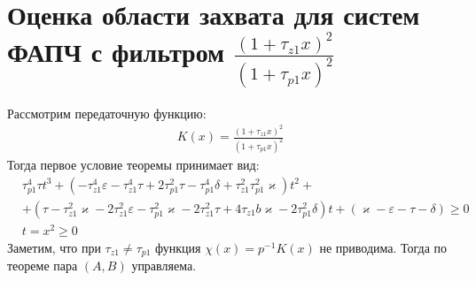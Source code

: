 \documentclass[a4paper,14pt]{extarticle} %
\begin{document}
\section{Оценка области захвата для систем ФАПЧ с фильтром $\frac{(1+\tau_{z1}x)^2}{(1+\tau_{p1}x)^2}$}
 Рассмотрим передаточную функцию:
 \begin{equation}\label{filter2}
 \begin{aligned}
K(x) = \frac{(1+\tau_{z1}x)^2}{(1+\tau_{p1}x)^2}
 \end{aligned}
\end{equation}
Тогда первое условие теоремы принимает вид:
 \begin{equation}\label{second_condition}
 \begin{aligned}
&\tau_{p1}^4\tau t^3 +(- \tau_{z1}^4\varepsilon - \tau_{z1}^4\tau + 2\tau_{p1}^2\tau- \tau_{p1}^4\delta + \tau_{z1}^2\tau_{p1}^2\varkappa)t^2  +\\
&+( \tau- \tau_{z1}^2\varkappa - 2\tau_{z1}^2\varepsilon - \tau_{p1}^2\varkappa- 2\tau_{z1}^2\tau+ 4\tau_{z1}b\varkappa- 2\tau_{p1}^2\delta)t + (\varkappa-\varepsilon - \tau - \delta)  \geq 0\\
&t = x^2 \geq 0
 \end{aligned}
\end{equation}
Заметим, что при $\tau_{z1} \neq \tau_{p1}$ функция $\chi (x) = p^{-1}K(x)$ не приводима. Тогда по теореме пара $(A, B)$ управляема.
\end{document}
